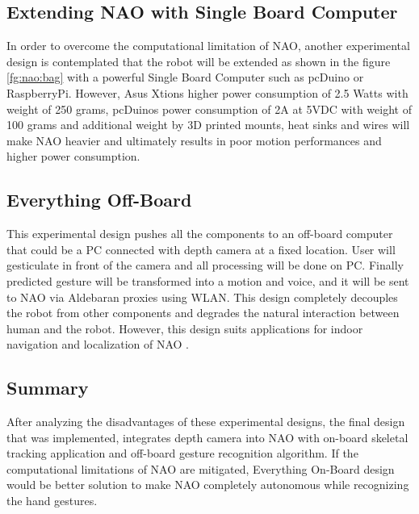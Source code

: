 \subsection*{Extending NAO with Single Board Computer} In order to overcome the computational limitation of NAO, another experimental design is contemplated that the robot will be extended as shown in the figure \ref{fg:nao:bag} with a powerful Single Board Computer such as pcDuino or RaspberryPi. However, Asus Xtions higher power consumption of 2.5 Watts with weight of 250 grams, pcDuinos power consumption of 2A at 5VDC with weight of 100 grams and additional weight by 3D printed mounts, heat sinks and wires will make NAO heavier and ultimately results in poor motion performances and higher power consumption. 



\subsection*{Everything Off-Board} This experimental design pushes all the components to an off-board computer that could be a PC connected with depth camera at a fixed location. User will gesticulate in front of the camera and all processing will be done on PC. Finally predicted gesture will be transformed into a motion and voice, and it will be sent to NAO via Aldebaran proxies using WLAN. This design completely decouples the robot from other components and degrades the natural interaction between human and the robot. However, this design suits applications for indoor navigation and localization of NAO \cite{20}.

\subsection*{Summary} After analyzing the disadvantages of these experimental designs, the final design that was implemented, integrates depth camera into NAO with on-board skeletal tracking application and off-board gesture recognition algorithm. If the computational limitations of NAO are mitigated, Everything On-Board design would be better solution to make NAO completely autonomous while recognizing the hand gestures. 

